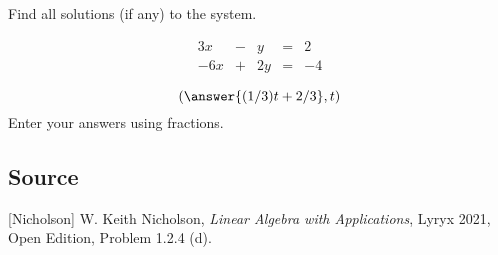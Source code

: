 \documentclass{ximera}
\author{}
\begin{document}
\begin{exercise}
Find all solutions (if any) to the system.  

$$\begin{matrix}
      3x& -&y&=&2\\
      -6x & +&2y&= &-4
    \end{matrix}$$

 $$(\answer{(1/3)t+2/3}, t)$$
Enter your answers using fractions.  
\end{exercise}

\subsection*{Source}
[Nicholson] W. Keith Nicholson, {\it Linear Algebra with Applications}, Lyryx 2021, Open Edition, Problem 1.2.4 (d).
\end{document}

